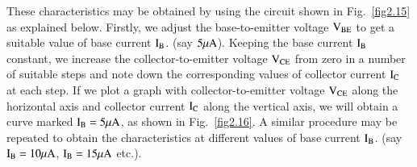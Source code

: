  These characteristics may be obtained by using the circuit shown in Fig.~\ref{fig2.15} as explained below. Firstly, we adjust the base-to-emitter voltage $\textrm{V}_{\text{BE}}$ to get a suitable value of base current $\textrm{I}_{\textrm{B}}$. (say $5\mu\textrm{A}$). Keeping the base current $\textrm{I}_{\textrm{B}}$ constant, we increase the collector-to-emitter voltage $\textrm{V}_{\text{CE}}$ from zero in a number of suitable steps and note down the corresponding values of collector current $\textrm{I}_{\textrm{C}}$ at each step. If we plot a graph with collector-to-emitter voltage $\textrm{V}_{\text{CE}}$ along the horizontal axis and collector current $\textrm{I}_{\textrm{C}}$ along the vertical axis, we will obtain a curve marked $\textrm{I}_{\textrm{B}}=5\mu\textrm{A}$, as shown in Fig.~\ref{fig2.16}. A similar procedure may be repeated to obtain the characteristics at different values of base current $\textrm{I}_{\textrm{B}}$. (say $\textrm{I}_{\textrm{B}}=10\mu\textrm{A}$, $\textrm{I}_{\textrm{B}}=15\mu\textrm{A}$ etc.).

